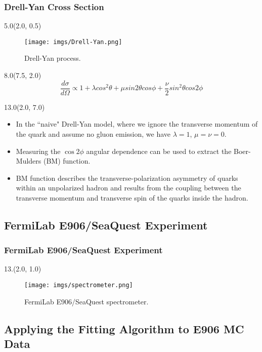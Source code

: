 \documentclass[12pt, xcolor={dvipsnames}, aspectratio = 169, sans,mathserif]{beamer}
\newenvironment{List}[2]
{\begin{textblock}{#1}#2
\begin{itemize}}
{\end{itemize}
\end{textblock}}
\newenvironment{Pic}[2]
{\begin{textblock}{#1}#2
\begin{figure}}
{\end{figure}
\end{textblock}}
\begin{document}
\begin{frame}
\frametitle{Drell-Yan Cross Section}

\begin{Pic}{5.0}{(2.0, 0.5)}
\texttt{[image: imgs/Drell-Yan.png]}
\caption{Drell-Yan process.}
\end{Pic}

\begin{textblock}{8.0}(7.5, 2.0)
\begin{equation*}
\frac{d\sigma}{d\Omega} \propto 1 + \lambda cos^{2}\theta + \mu sin2\theta cos\phi + \frac{\nu}{2} sin^{2}\theta cos2\phi
\end{equation*}
\end{textblock}

\begin{List}{13.0}{(2.0, 7.0)}

  \item In the ``naive" Drell-Yan model, where we ignore the transverse momentum of the quark and assume no gluon emission,
  we have $\lambda = 1$, $\mu = \nu = 0$.

  \item Measuring the $\cos 2\phi$ angular dependence can be used to extract the Boer-Mulders (BM) function.

  \item BM function describes the transverse-polarization asymmetry of quarks within an unpolarized hadron and results
  from the coupling between the transverse momentum and transverse spin of the quarks inside the hadron.

\end{List}

\end{frame}


\subsection{FermiLab E906/SeaQuest Experiment}

\begin{frame}
\frametitle{FermiLab E906/SeaQuest Experiment}

\begin{Pic}{13.}{(2.0, 1.0)}
\texttt{[image: imgs/spectrometer.png]}
\caption{FermiLab E906/SeaQuest spectrometer.}
\end{Pic}

\end{frame}

\subsection{Applying the Fitting Algorithm to E906 MC Data}
\end{document}
